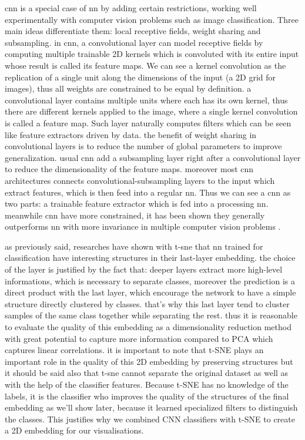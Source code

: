 \documentclass[a4paper,12pt]{report}
\begin{document}
cnn is a special case of nn by adding certain restrictions, working well experimentally with computer vision problems such as image classification.
Three main ideas differentiate them: local receptive fields, weight sharing and subsampling.
in cnn, a convolutional layer can model receptive fields by computing multiple trainable 2D kernels which is convoluted with its entire input whose result is called its feature maps.
We can see a kernel convolution as the replication of a single unit along the dimensions of the input (a 2D grid for images), thus all weights are constrained to be equal by definition.
a convolutional layer contains multiple units where each has its own kernel, thus there are different kernels applied to the image, where a single kernel convolution is called a feature map.
Such layer naturally computes filters which can be seen like feature extractors driven by data.
the benefit of weight sharing in convolutional layers is to reduce the number of global parameters to improve generalization.
usual cnn add a subsampling layer right after a convolutional layer to reduce the dimensionality of the feature maps.
moreover most cnn architectures connects convolutional-subsampling layers to the input which extract features, which is then feed into a regular nn.
Thus we can see a cnn as two parts: a trainable feature extractor which is fed into a processing nn.
meanwhile cnn have more constrained, it has been shown they generally outperforms nn with more invariance in multiple computer vision problems \cite{simard2003best}\cite{mnist_web}\cite{lawrence1997face}\cite{krizhevsky2012imagenet}.

as previously said, researches have shown with t-sne that nn trained for classification have interesting structures in their last-layer embedding.
the choice of the layer is justified by the fact that: deeper layers extract more high-level informations, which is necessary to separate classes, moreover the prediction is a direct product with the last layer, which encourage the network to have a simple structure directly clustered by classes.
that's why this last layer tend to cluster samples of the same class together while separating the rest\cite{donahue2013decaf}\cite{yu2014visualizing}.
thus it is reasonable to evaluate the quality of this embedding as a dimensionality reduction method with great potential to capture more information compared to PCA which captures linear correlations.
it is important to note that t-SNE plays an important role in the quality of this 2D embedding by preserving structures but it should be said also that t-sne cannot separate the original dataset as well as with the help of the classifier features.
Because t-SNE has no knowledge of the labels, it is the classifier who improves the quality of the structures of the final embedding as we'll show later, because it learned specialized filters to distinguish the classes.
This justifies why we combined CNN classifiers with t-SNE to create a 2D embedding for our visualisations.
\end{document}
